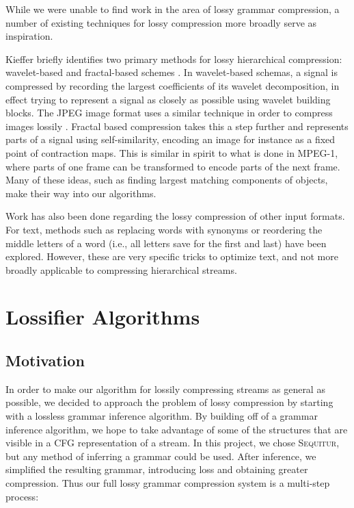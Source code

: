 \documentclass[11pt]{article}
\newcommand{\Sequitur}{\textsc{Sequitur}\xspace}
\begin{document}
While we were unable to find work in the area of lossy grammar compression, a
number of existing techniques for lossy compression more broadly serve
as inspiration.

Kieffer briefly identifies two primary methods for lossy hierarchical
compression: wavelet-based and fractal-based schemes \cite{tutorial}.  In
wavelet-based schemas, a signal is compressed by recording the largest
coefficients of its wavelet decomposition, in effect trying to represent a
signal as closely as possible using wavelet building blocks.  The JPEG image
format uses a similar technique in order to compress images lossily
\cite{jpeg}.  Fractal based compression takes this a step further and
represents parts of a signal using self-similarity, encoding an image for
instance as a fixed point of contraction maps.  This is similar in spirit to
what is done in MPEG-1, where parts of one frame can be transformed to encode
parts of the next frame. Many of these ideas, such as finding largest matching
components of objects, make their way into our algorithms.

Work has also been done regarding the lossy compression of other input formats.
For text, methods such as replacing words with synonyms \cite{semanticlossy} or
reordering the middle letters of a word (i.e., all letters save for the first
and last) \cite{semilossless} have been explored.  However, these are very
specific tricks to optimize text, and not more broadly applicable to
compressing hierarchical streams.

\section{Lossifier Algorithms}

\subsection{Motivation}

In order to make our algorithm for lossily compressing streams as general as
possible, we decided to approach the problem of lossy compression by starting
with a lossless grammar inference algorithm.  By building off of a grammar
inference algorithm, we hope to take advantage of some of the structures that
are visible in a CFG representation of a stream.  In this project, we chose
\Sequitur, but any method of inferring a grammar could be used.  After
inference, we simplified the resulting grammar, introducing loss and obtaining
greater compression.  Thus our full lossy grammar compression system is a
multi-step process:
\end{document}

